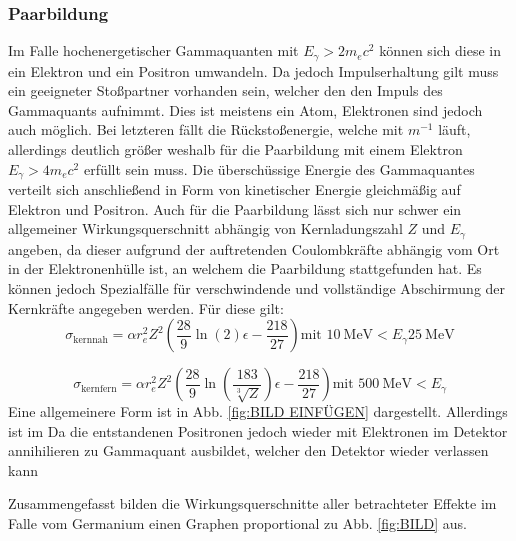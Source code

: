 \subsubsection{Paarbildung}
Im Falle hochenergetischer Gammaquanten mit $E_\gamma > 2 m_e c^2$ können sich diese in ein Elektron und ein Positron umwandeln. Da jedoch Impulserhaltung gilt muss ein geeigneter Stoßpartner vorhanden sein, welcher den den Impuls des Gammaquants aufnimmt. Dies ist meistens ein Atom, Elektronen sind jedoch auch möglich. Bei letzteren fällt die Rückstoßenergie, welche mit $m^{-1}$ läuft, allerdings deutlich größer weshalb für die Paarbildung mit einem Elektron $E_\gamma > 4 m_e c^2$ erfüllt sein muss. Die überschüssige Energie des Gammaquantes verteilt sich anschließend in Form von kinetischer Energie gleichmäßig auf Elektron und Positron. Auch für die Paarbildung lässt sich nur schwer ein allgemeiner Wirkungsquerschnitt abhängig von Kernladungszahl $Z$ und $E_\gamma$ angeben, da dieser aufgrund der auftretenden Coulombkräfte abhängig vom Ort in der Elektronenhülle ist, an welchem die Paarbildung stattgefunden hat. Es können jedoch Spezialfälle für verschwindende und vollständige Abschirmung der Kernkräfte angegeben werden. Für diese gilt:
\begin{equation}
    \sigma_\text{kernnah} = \alpha r_e^2 Z^2 \left( \frac{28}{9}\ln(2) \epsilon - \frac{218}{27}\right) \text{mit } \SI{10}{\mega\electronvolt} < E_\gamma \SI{25}{\mega\electronvolt}
\end{equation}

\begin{equation}
    \sigma_\text{kernfern} = \alpha r_e^2 Z^2 \left( \frac{28}{9}\ln\left(\frac{183}{\sqrt[3]{Z}}\right) \epsilon - \frac{218}{27}\right) \text{mit } \SI{500}{\mega\electronvolt} < E_\gamma
\end{equation}
Eine allgemeinere Form ist in Abb. \ref{fig:BILD EINFÜGEN} dargestellt.
Allerdings ist im 
Da die entstandenen Positronen jedoch wieder mit Elektronen im Detektor annihilieren zu  Gammaquant ausbildet, welcher den Detektor wieder verlassen kann


Zusammengefasst bilden die Wirkungsquerschnitte aller betrachteter Effekte im Falle vom Germanium einen Graphen proportional zu Abb. \ref{fig:BILD} aus. %



